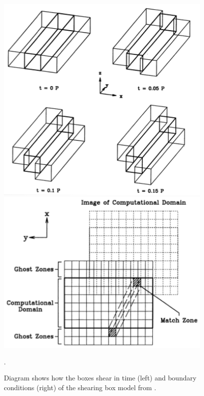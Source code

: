 \documentclass{jfm}
\begin{document}
\begin{figure}
    \begin{minipage}[t]{0.5\textwidth}
        \begin{center}
            \includegraphics[width=0.95\textwidth]{shearbox1}
        \end{center}
    \end{minipage}
    \hfill
    \begin{minipage}[t]{0.5\textwidth}
        \begin{center}
            \includegraphics[width=0.95\textwidth]{shearbox2}
        \end{center}
    \end{minipage}
    \caption{Diagram shows how the boxes shear in time (left) and boundary conditions (right) of the shearing box model from \cite{Balbus1991}.}.
    \label{fig:shearbox}
\end{figure}
\end{document}
